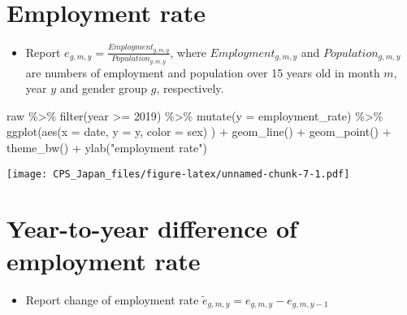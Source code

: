 \documentclass[
]{book}
\newenvironment{Shaded}{\begin{snugshade}}{\end{snugshade}}
\newcommand{\AttributeTok}[1]{\textcolor[rgb]{0.77,0.63,0.00}{#1}}
\newcommand{\DecValTok}[1]{\textcolor[rgb]{0.00,0.00,0.81}{#1}}
\newcommand{\FunctionTok}[1]{\textcolor[rgb]{0.00,0.00,0.00}{#1}}
\newcommand{\NormalTok}[1]{#1}
\newcommand{\SpecialCharTok}[1]{\textcolor[rgb]{0.00,0.00,0.00}{#1}}
\newcommand{\StringTok}[1]{\textcolor[rgb]{0.31,0.60,0.02}{#1}}
\providecommand{\tightlist}{%
  \setlength{\itemsep}{0pt}\setlength{\parskip}{0pt}}
\begin{document}
\hypertarget{employment-rate-1}{%
\section{Employment rate}\label{employment-rate-1}}

\begin{itemize}
\tightlist
\item
  Report \(e_{g,m,y} = \frac{Employment_{g,m,y}}{Population_{g,m,y}}\), where \(Employment_{g,m,y}\) and \(Population_{g,m,y}\) are numbers of employment and population over 15 years old in month \(m\), year \(y\) and gender group \(g\), respectively.
\end{itemize}

\begin{Shaded}
\begin{Highlighting}[]
\NormalTok{raw  }\SpecialCharTok{\%\textgreater{}\%}
  \FunctionTok{filter}\NormalTok{(year }\SpecialCharTok{\textgreater{}=} \DecValTok{2019}\NormalTok{) }\SpecialCharTok{\%\textgreater{}\%}
  \FunctionTok{mutate}\NormalTok{(}\AttributeTok{y =}\NormalTok{ employment\_rate) }\SpecialCharTok{\%\textgreater{}\%}
  \FunctionTok{ggplot}\NormalTok{(}\FunctionTok{aes}\NormalTok{(}\AttributeTok{x =}\NormalTok{ date,}
             \AttributeTok{y =}\NormalTok{ y,}
             \AttributeTok{color =}\NormalTok{ sex)}
\NormalTok{         ) }\SpecialCharTok{+}
  \FunctionTok{geom\_line}\NormalTok{() }\SpecialCharTok{+}
  \FunctionTok{geom\_point}\NormalTok{() }\SpecialCharTok{+}
  \FunctionTok{theme\_bw}\NormalTok{() }\SpecialCharTok{+}
  \FunctionTok{ylab}\NormalTok{(}\StringTok{"employment rate"}\NormalTok{)}
\end{Highlighting}
\end{Shaded}

\texttt{[image: CPS\_Japan\_files/figure-latex/unnamed-chunk-7-1.pdf]}

\hypertarget{year-to-year-difference-of-employment-rate-2}{%
\section{Year-to-year difference of employment rate}\label{year-to-year-difference-of-employment-rate-2}}

\begin{itemize}
\tightlist
\item
  Report change of employment rate \(\tilde e_{g,m,y}=e_{g,m,y}-e_{g,m,y-1}\)
\end{itemize}
\end{document}
